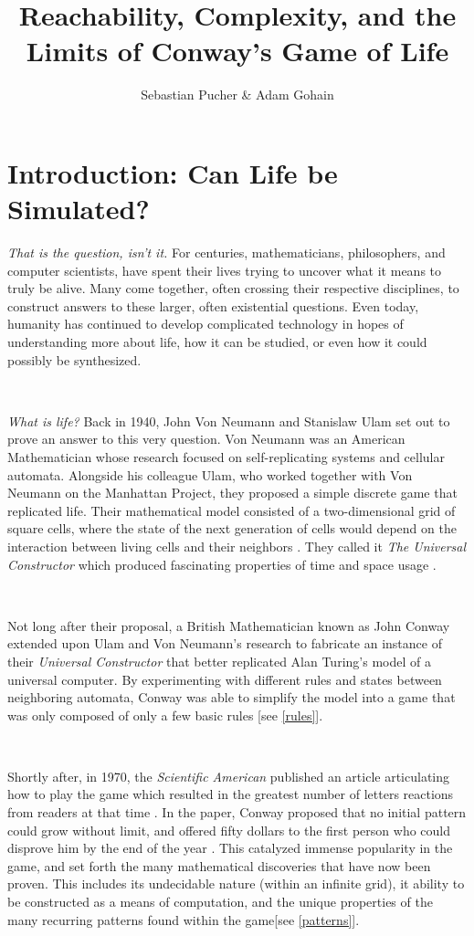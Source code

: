 \documentclass{article}
\title{Reachability, Complexity, and the Limits of Conway's Game of Life}
\author{Sebastian Pucher \& Adam Gohain}
\theoremstyle{definition}
\theoremstyle{plain}
\theoremstyle{plain}
\begin{document}
\maketitle

\tableofcontents

\newpage

\section{Introduction: Can Life be Simulated?}
  \textit{    That is the question, isn't it.} For centuries, mathematicians, philosophers, and computer scientists, have spent their lives trying to uncover what it means to truly be alive. Many come together, often crossing their respective disciplines, to construct answers to these larger, often existential questions. Even today, humanity has continued to develop complicated technology in hopes of understanding more about life, how it can be studied, or even how it could possibly be synthesized.

\

\textit{What is life?} Back in 1940, John Von Neumann and Stanislaw Ulam set out to prove an answer to this very question. Von Neumann was an American Mathematician whose research focused on self-replicating systems and cellular automata. Alongside his colleague Ulam, who worked together with Von Neumann on the Manhattan Project, they proposed a simple discrete game that replicated life. Their mathematical model consisted of a two-dimensional grid of square cells, where the state of the next generation of cells would depend on the interaction between living cells and their neighbors \cite{Beginning_Life_2006}. They called it \textit{The Universal Constructor} which produced fascinating properties of time and space usage \cite{Freitas_2004}.

\

Not long after their proposal, a British Mathematician known as John Conway extended upon Ulam and Von Neumann’s research to fabricate an instance of their \textit{Universal Constructor} that better replicated Alan Turing’s model of a universal computer. By experimenting with different rules and states between neighboring automata, Conway was able to simplify the model into a game that was only composed of only a few basic rules \cite{Beginning_Life_2006} [see \ref{rules}]. 

\

Shortly after, in 1970, the \textit{Scientific American} published an article articulating how to play the game which resulted in the greatest number of letters reactions from readers at that time \cite{Izhikevich_Conway_Seth}. In the paper, Conway proposed that no initial pattern could grow without limit, and offered fifty dollars to the first person who could disprove him by the end of the year \cite{math-games}. This catalyzed immense popularity in the game, and set forth the many mathematical discoveries that have now been proven. This includes its undecidable nature (within an infinite grid), it ability to be constructed as a means of computation, and the unique properties of the many recurring patterns found within the game[see \ref{patterns}].
\end{document}
